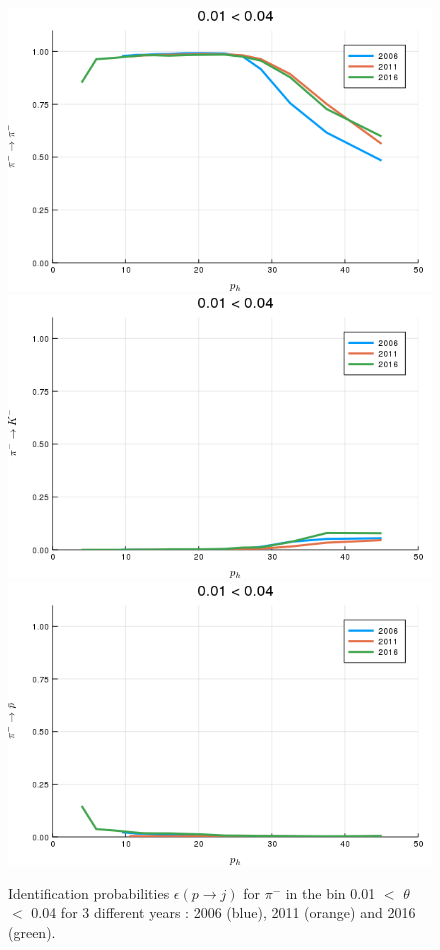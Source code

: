 \begin{figure}[!p]
  \centering
	\includegraphics[scale=0.35]{./gfx/t1/pim2pim.png}
  \includegraphics[scale=0.35]{./gfx/t1/pim2km.png}
  \includegraphics[scale=0.35]{./gfx/t1/pim2pm.png}
	\caption{Identification probabilities $\epsilon(p \rightarrow j)$ for $\pi^-$ in the bin 0.01 $<$ $\theta$ $<$ 0.04 for 3 different years : 2006 (blue), 2011 (orange) and 2016 (green).}
	\label{pic:comppim}
\end{figure}

